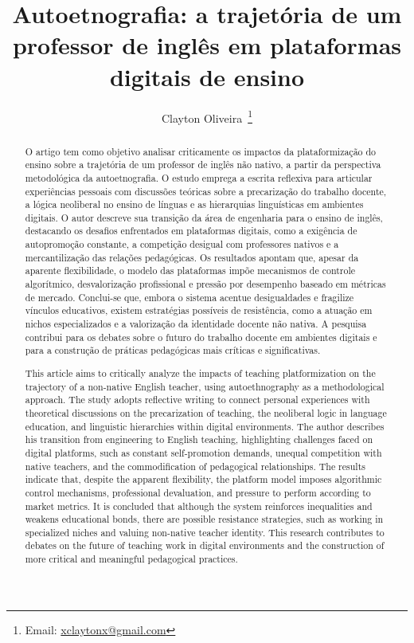 \documentclass[portuguese]{textolivre}
\title{Autoetnografia: a trajetória de um professor de inglês em plataformas digitais de ensino}
\author[1]{Clayton Oliveira~\orcid{0009-0000-4527-9146}\thanks{Email: \href{mailto:xclaytonx@gmail.com}{xclaytonx@gmail.com}}}
\affil[1]{Universidade Federal de Minas Gerais, Faculdade de Letras, Programa de Pós-Graduação em Estudos Linguísticos, Belo Horizonte, MG, Brasil.}
\begin{document}
\maketitle

\begin{polyabstract}
\begin{abstract}
O artigo tem como objetivo analisar criticamente os impactos da plataformização do ensino sobre a trajetória de um professor de inglês não nativo, a partir da perspectiva metodológica da autoetnografia. O estudo emprega a escrita reflexiva para articular experiências pessoais com discussões teóricas sobre a precarização do trabalho docente, a lógica neoliberal no ensino de línguas e as hierarquias linguísticas em ambientes digitais. O autor descreve sua transição da área de engenharia para o ensino de inglês, destacando os desafios enfrentados em plataformas digitais, como a exigência de autopromoção constante, a competição desigual com professores nativos e a mercantilização das relações pedagógicas. Os resultados apontam que, apesar da aparente flexibilidade, o modelo das plataformas impõe mecanismos de controle algorítmico, desvalorização profissional e pressão por desempenho baseado em métricas de mercado. Conclui-se que, embora o sistema acentue desigualdades e fragilize vínculos educativos, existem estratégias possíveis de resistência, como a atuação em nichos especializados e a valorização da identidade docente não nativa. A pesquisa contribui para os debates sobre o futuro do trabalho docente em ambientes digitais e para a construção de práticas pedagógicas mais críticas e significativas.


\end{abstract}

\begin{english}
\begin{abstract}
This article aims to critically analyze the impacts of teaching platformization on the trajectory of a non-native English teacher, using autoethnography as a methodological approach. The study adopts reflective writing to connect personal experiences with theoretical discussions on the precarization of teaching, the neoliberal logic in language education, and linguistic hierarchies within digital environments. The author describes his transition from engineering to English teaching, highlighting challenges faced on digital platforms, such as constant self-promotion demands, unequal competition with native teachers, and the commodification of pedagogical relationships. The results indicate that, despite the apparent flexibility, the platform model imposes algorithmic control mechanisms, professional devaluation, and pressure to perform according to market metrics. It is concluded that although the system reinforces inequalities and weakens educational bonds, there are possible resistance strategies, such as working in specialized niches and valuing non-native teacher identity. This research contributes to debates on the future of teaching work in digital environments and the construction of more critical and meaningful pedagogical practices.


\end{abstract}
\end{english}
\end{polyabstract}
\end{document}
